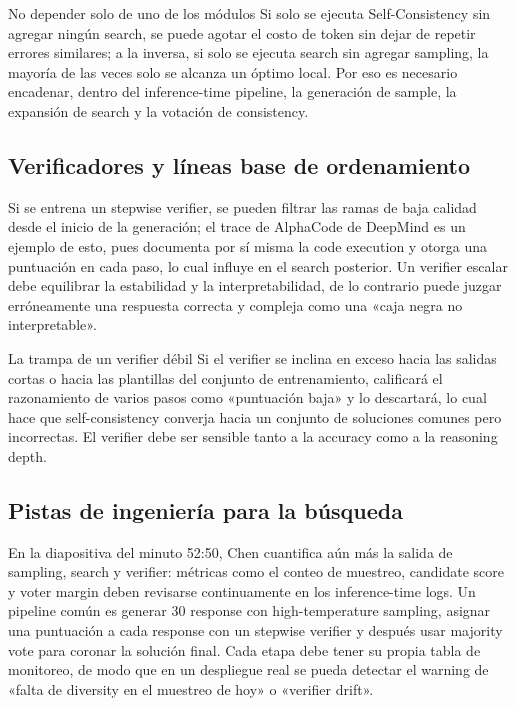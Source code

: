 \begin{warningbox}{No depender solo de uno de los módulos}
Si solo se ejecuta Self-Consistency sin agregar ningún search, se puede agotar el costo de token sin dejar de repetir errores similares; a la inversa, si solo se ejecuta search sin agregar sampling, la mayoría de las veces solo se alcanza un óptimo local. Por eso es necesario encadenar, dentro del inference-time pipeline, la generación de sample, la expansión de search y la votación de consistency.
\end{warningbox}

\subsection{Verificadores y líneas base de ordenamiento}
Si se entrena un stepwise verifier, se pueden filtrar las ramas de baja calidad desde el inicio de la generación; el trace de AlphaCode de DeepMind es un ejemplo de esto, pues documenta por sí misma la code execution y otorga una puntuación en cada paso, lo cual influye en el search posterior. Un verifier escalar debe equilibrar la estabilidad y la interpretabilidad, de lo contrario puede juzgar erróneamente una respuesta correcta y compleja como una «caja negra no interpretable».

\begin{warningbox}{La trampa de un verifier débil}
Si el verifier se inclina en exceso hacia las salidas cortas o hacia las plantillas del conjunto de entrenamiento, calificará el razonamiento de varios pasos como «puntuación baja» y lo descartará, lo cual hace que self-consistency converja hacia un conjunto de soluciones comunes pero incorrectas. El verifier debe ser sensible tanto a la accuracy como a la reasoning depth.
\end{warningbox}

\subsection{Pistas de ingeniería para la búsqueda}
En la diapositiva del minuto 52:50, Chen cuantifica aún más la salida de sampling, search y verifier: métricas como el conteo de muestreo, candidate score y voter margin deben revisarse continuamente en los inference-time logs. Un pipeline común es generar 30 response con high-temperature sampling, asignar una puntuación a cada response con un stepwise verifier y después usar majority vote para coronar la solución final. Cada etapa debe tener su propia tabla de monitoreo, de modo que en un despliegue real se pueda detectar el warning de «falta de diversity en el muestreo de hoy» o «verifier drift».

